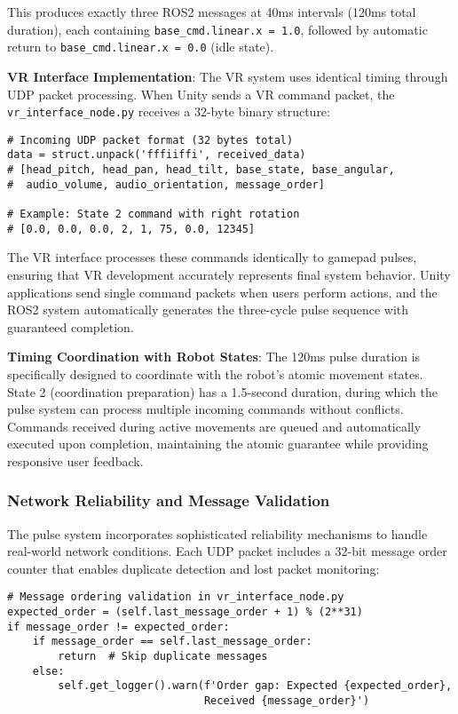 This produces exactly three ROS2 messages at 40ms intervals (120ms total duration), each containing \texttt{base\_cmd.linear.x = 1.0}, followed by automatic return to \texttt{base\_cmd}\linebreak\texttt{.linear.x = 0.0} (idle state).

\textbf{VR Interface Implementation}: The VR system uses identical timing through UDP packet processing. When Unity sends a VR command packet, the \texttt{vr\_interface\_node.py} receives a 32-byte binary structure:

\begin{verbatim}
# Incoming UDP packet format (32 bytes total)
data = struct.unpack('fffiiffi', received_data)
# [head_pitch, head_pan, head_tilt, base_state, base_angular, 
#  audio_volume, audio_orientation, message_order]

# Example: State 2 command with right rotation
# [0.0, 0.0, 0.0, 2, 1, 75, 0.0, 12345]
\end{verbatim}

The VR interface processes these commands identically to gamepad pulses, ensuring that VR development accurately represents final system behavior. Unity applications send single command packets when users perform actions, and the ROS2 system automatically generates the three-cycle pulse sequence with guaranteed completion.

\textbf{Timing Coordination with Robot States}: The 120ms pulse duration is specifically designed to coordinate with the robot's atomic movement states. State 2 (coordination preparation) has a 1.5-second duration, during which the pulse system can process multiple incoming commands without conflicts. Commands received during active movements are queued and automatically executed upon completion, maintaining the atomic guarantee while providing responsive user feedback.

\subsubsection{Network Reliability and Message Validation}

The pulse system incorporates sophisticated reliability mechanisms to handle real-world network conditions. Each UDP packet includes a 32-bit message order counter that enables duplicate detection and lost packet monitoring:

\begin{verbatim}
# Message ordering validation in vr_interface_node.py
expected_order = (self.last_message_order + 1) % (2**31)
if message_order != expected_order:
    if message_order == self.last_message_order:
        return  # Skip duplicate messages
    else:
        self.get_logger().warn(f'Order gap: Expected {expected_order}, 
                               Received {message_order}')
\end{verbatim}

